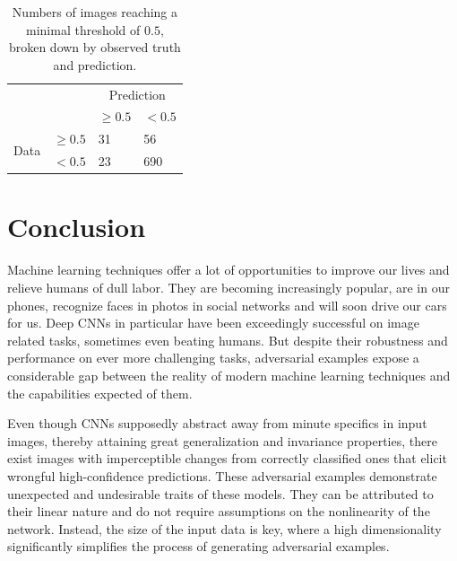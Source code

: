 \documentclass[11pt, a4paper]{article}
\begin{document}
\begin{table}[h!tp]
	\centering
	\begin{tabular}{|ll|ll|}
		\hline
		& & \multicolumn{2}{c|}{Prediction} \\
		& & $\geq 0.5$ & $< 0.5$ \\
		\hline
		\multirow{2}{*}{Data} & $\geq 0.5$ & 31 & 56 \\
		& $< 0.5$ & 23 & 690 \\
		\hline
	\end{tabular}
	\caption[Image counts reaching a threshold as observed and predicted by curve fitting]{Numbers of images reaching a minimal threshold of $0.5$, broken down by observed truth and prediction.}
	\label{tab:prediction-quantities}
\end{table}












\section{Conclusion}
Machine learning techniques offer a lot of opportunities to improve our lives and relieve humans of dull labor. They are becoming increasingly popular, are in our phones, recognize faces in photos in social networks and will soon drive our cars for us. Deep CNNs in particular have been exceedingly successful on image related tasks, sometimes even beating humans. But despite their robustness and performance on ever more challenging tasks, adversarial examples expose a considerable gap between the reality of modern machine learning techniques and the capabilities expected of them.

Even though CNNs supposedly abstract away from minute specifics in input images, thereby attaining great generalization and invariance properties, there exist images with imperceptible changes from correctly classified ones that elicit wrongful high-confidence predictions. These adversarial examples demonstrate unexpected and undesirable traits of these models. They can be attributed to their linear nature and do not require assumptions on the nonlinearity of the network. Instead, the size of the input data is key, where a high dimensionality significantly simplifies the process of generating adversarial examples.
\end{document}
